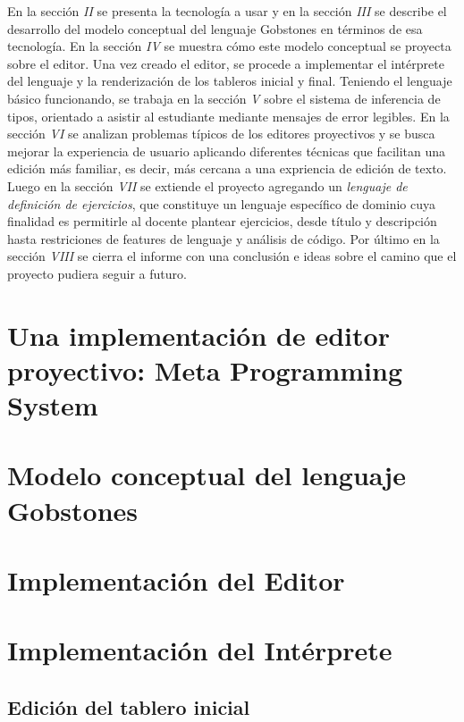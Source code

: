 En la sección \textit{II} se presenta la tecnología a usar y en la sección \textit{III} se describe el desarrollo del modelo conceptual del lenguaje Gobstones en términos de esa tecnología. En la sección \textit{IV} se muestra cómo este modelo conceptual se proyecta sobre el editor. Una vez creado el editor, se procede a implementar el intérprete del lenguaje y la renderización de los tableros inicial y final. Teniendo el lenguaje básico funcionando, se trabaja en la sección \textit{V} sobre el sistema de inferencia de tipos, orientado a asistir al estudiante mediante mensajes de error legibles. En la sección \textit{VI} se analizan problemas típicos de los editores proyectivos y se busca mejorar la experiencia de usuario aplicando diferentes técnicas que facilitan una edición más familiar, es decir, más cercana a una expriencia de edición de texto. Luego en la sección \textit{VII} se extiende el proyecto agregando un \textit{lenguaje de definición de ejercicios}, que constituye un lenguaje específico de dominio cuya finalidad es permitirle al docente plantear ejercicios, desde título y descripción hasta restriciones de features de lenguaje y análisis de código. Por último en la sección \textit{VIII} se cierra el informe con una conclusión e ideas sobre el camino que el proyecto pudiera seguir a futuro.

\section{Una implementación de editor proyectivo: Meta Programming System}

\section{Modelo conceptual del lenguaje Gobstones}

\section{Implementación del Editor}

\section{Implementación del Intérprete}

\subsection{Edición del tablero inicial}

